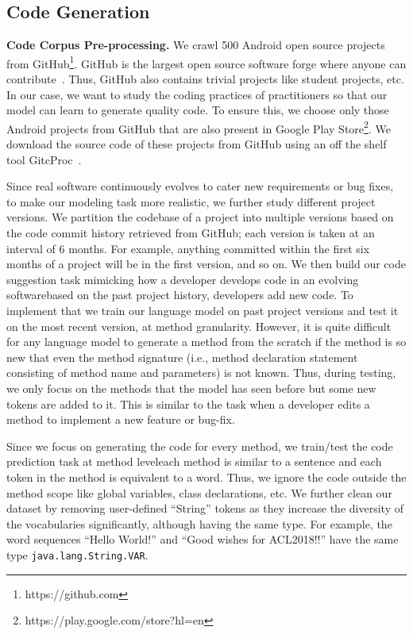 \documentclass[11pt,a4paper]{article}
\begin{document}
\subsection{Code Generation}
\label{code}

\textbf{Code Corpus Pre-processing.} We crawl 500 Android open source projects from GitHub\footnote{https://github.com}. 
GitHub is the largest open source software forge where anyone can contribute~\cite{ray2014large}. Thus, GitHub also contains trivial projects like student projects, etc. In our case, we want to study the coding practices of practitioners so that our model can learn to generate quality code. To ensure this, we choose only those Android projects from GitHub that are also present in Google Play Store\footnote{https://play.google.com/store?hl=en}. We download the source code of these projects from GitHub using an off the shelf tool GitcProc~\cite{casalnuovo2017gitcproc}.

Since real software continuously evolves to cater new requirements or bug fixes, to make our modeling task more realistic, we further study different project versions. We partition the codebase of a project into multiple versions based on the code commit history retrieved from GitHub; each version is taken at an interval of 6 months. For example, anything committed within the first six months of a project will be in the first version, and so on. We then build our code suggestion task mimicking how a developer develops code in an evolving software\textemdash based on the past project history, developers add new code. To implement that we train our language model on past project versions and test it on the most recent version, at method granularity. However, it is quite difficult for any language model to generate a method from the scratch if the method is so new that even the method signature (i.e., method declaration statement consisting of method name and parameters) is not known. Thus, during testing, we only focus on the methods that the model has seen before but some new tokens are added to it. This is similar to the task when a developer edits a method to implement a new feature or bug-fix.

Since we focus on generating the code for every method, we train/test the code prediction task at method level\textemdash each method is similar to a sentence and each token in the method is equivalent to a word. Thus, we ignore the code outside the method scope like global variables, class declarations, etc. We further clean our dataset by removing user-defined ``String'' tokens as they increase the diversity of the vocabularies significantly, although having the same type.  For example, the word sequences ``Hello World!'' and  ``Good wishes for ACL2018!!'' have the same type {\tt java.lang.String.VAR}. 
\end{document}
